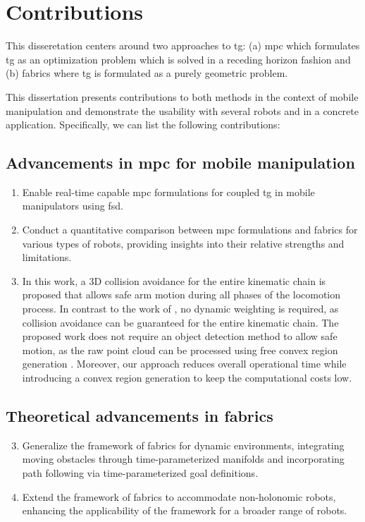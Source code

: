 \section{Contributions}
\label{sec:contributions}

This disseretation centers around two approaches to
\ac{tg}: (a) \ac{mpc} which formulates
\ac{tg} as an optimization problem which is
solved in a receding horizon fashion and (b) \ac{fabrics}
where \ac{tg} is formulated as a 
purely geometric problem.

This dissertation presents contributions to both methods in
the context of mobile manipulation and demonstrate the
usability with several robots and in a concrete application.
Specifically, we can list the following contributions:


\subsection{Advancements in \ac{mpc} for mobile manipulation}
\begin{enumerate}
    \item Enable real-time capable \ac{mpc} formulations for
      coupled \ac{tg} in mobile manipulators
      using \ac{fsd}.
    \item Conduct a quantitative comparison between \ac{mpc}
      formulations and \ac{fabrics} for various types of
      robots, providing insights into their relative
      strengths and limitations.
    \item In this work, a 3D collision avoidance for the
      entire kinematic chain is proposed that allows safe
      arm motion during all phases of the locomotion
      process. In contrast to the work of
      \cite{Avanzini2018}, no dynamic weighting is required,
      as collision avoidance can be guaranteed for the
      entire kinematic chain. The proposed work does not
      require an object detection method to allow safe
      motion, as the raw point cloud can be processed using
      free convex region generation \cite{Liu2017}.
      Moreover, our approach reduces overall operational
      time while introducing a convex region generation to
      keep the computational costs low. 
\end{enumerate}

\subsection{Theoretical advancements in \ac{fabrics}}
\begin{enumerate}
    \setcounter{enumi}{2}
    \item Generalize the framework of \ac{fabrics}
      for dynamic environments, integrating moving obstacles
      through time-parameterized manifolds and incorporating
      path following via time-parameterized goal
      definitions.
    \item Extend the framework of \ac{fabrics} to
      accommodate non-holonomic robots, enhancing the
      applicability of the framework for a broader range of
      robots.
\end{enumerate}

